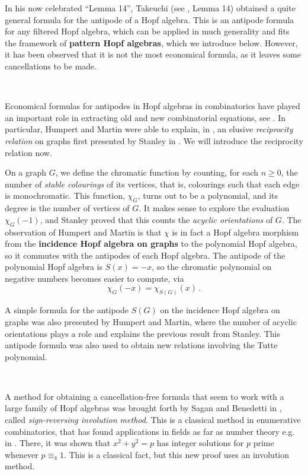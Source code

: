 \documentclass[12pt, reqno]{amsart}
\theoremstyle{definition}
\begin{document}
In his now celebrated  ``Lemma 14'', Takeuchi (see \cite{Takeuchi1971}, Lemma 14) obtained a quite general formula for the antipode of a Hopf algebra. 
This is an antipode formula for any filtered Hopf algebra, which can be applied in much generality and fits the framework of \textbf{pattern Hopf algebras}, which we introduce below.
However, it has been observed that it is not the most economical formula, as it leaves some cancellations to be made.

\

Economical formulas for antipodes in Hopf algebras in combinatorics have played an important role in extracting old and new combinatorial equations, see \cite{Schmitt1993, humpert2012incidence, BS2017, aguiar2017hopf, xu2022cancellation}.
In particular, Humpert and Martin were able to explain, in \cite{humpert2012incidence}, an elusive \textit{reciprocity relation} on graphs first presented by Stanley in \cite{stanley1975combinatorial}.
We will introduce the reciprocity relation now.

On a graph $G$, we define the chromatic function by counting, for each $n\geq 0$, the number of \textit{stable colourings} of its vertices, that is, colourings such that each edge is monochromatic.
This function, $\chi_G$, turns out to be a polynomial, and its degree is the number of vertices of $G$.
It makes sense to explore the evaluation $\chi_G(-1)$, and Stanley proved that this counts the \textit{acyclic orientations} of $G$.
The observation of Humpert and Martin is that $\chi$ is in fact a Hopf algebra morphism from the \textbf{incidence Hopf algebra on graphs} to the polynomial Hopf algebra, so it commutes with the antipodes of each Hopf algebra.
The antipode of the polynomial Hopf algebra is $S(x) = -x$, so the chromatic polynomial on negative numbers becomes easier to compute, via
$$\chi_G(-x) = \chi_{S(G)}(x)\, .$$

A simple formula for the antipode $S(G)$ on the incidence Hopf algebra on graphs was also presented by Humpert and Martin, where the number of acyclic orientations plays a role and explains the previous result from Stanley.
This antipode formula was also used to obtain new relations involving the Tutte polynomial.

\

A method for obtaining a cancellation-free formula that seem to work with a large family of Hopf algebras was brought forth by Sagan and Benedetti in \cite{BS2017}, called \textit{sign-reversing involution method}.
This is a classical method in enumerative combinatorics, that has found applications in fields as far as number theory e.g. in \cite{zagier2009one}.
There, it was shown that $x^2+y^2 = p$ has integer solutions for $p$ prime whenever $p\equiv_4 1$.
This is a classical fact, but this new proof uses an involution method.
\end{document}

